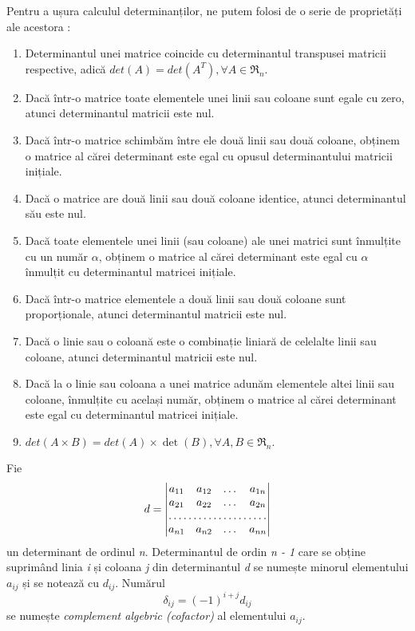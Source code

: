 Pentru a ușura calculul determinanților, ne putem folosi de o serie de
proprietăți ale acestora :
\begin{enumerate}
  \item Determinantul unei matrice coincide cu determinantul transpusei matricii
  respective, adică $det(A) = det(A^{T}), \forall A \in \mathfrak{R}_{n}$.
  \item Dacă într-o matrice toate elementele unei linii sau coloane sunt egale
  cu zero, atunci determinantul matricii este nul.
  \item Dacă într-o matrice schimbăm între ele două linii sau două coloane,
  obținem o matrice al cărei determinant este egal cu opusul determinantului
  matricii inițiale.
  \item Dacă o matrice are două linii sau două coloane identice, atunci
  determinantul său este nul.
  \item Dacă toate elementele unei linii (sau coloane) ale unei matrici sunt
  înmulțite cu un număr $\alpha$, obținem o matrice al cărei determinant este
  egal cu $\alpha$ înmulțit cu determinantul matricei inițiale.
  \item Dacă într-o matrice elementele a două linii sau 
  două coloane sunt proporționale, atunci determinantul matricii este nul.
  \item Dacă o linie sau o coloană este o combinație liniară de celelalte linii
  sau coloane, atunci determinantul matricii este nul.
  \item Dacă la o linie sau coloana a unei matrice adunăm elementele altei linii
  sau coloane, înmulțite cu același număr, obținem o matrice al cărei
  determinant este egal cu determinantul matricei inițiale.
  \item $det(A \times B) = det(A) \times \det(B), \forall A, B \in
  \mathfrak{R}_{n}$.
\end{enumerate}

Fie
\begin{equation*}
d = 
\begin{vmatrix}
a_{11} & a_{12} & \dots & a_{1n} \\
a_{21} & a_{22} & \dots & a_{2n} \\
\hdotsfor{4} \\
a_{n1} & a_{n2} & \dots & a_{nn}
\end{vmatrix}
\end{equation*} un determinant de ordinul \textit{n}. Determinantul de ordin
\textit{n - 1} care se obține suprimând linia \textit{i} și coloana \textit{j}
din determinantul \textit{d} se numește minorul elementului $\mathit{a_{ij}}$ și
se notează cu $\mathit{d_{ij}}$. Numărul 
\[
\delta_{ij} = (-1)^{i + j}d_{ij} 
\] se numește \textit{complement algebric (cofactor)} al elementului
$\mathit{a_{ij}}$.

